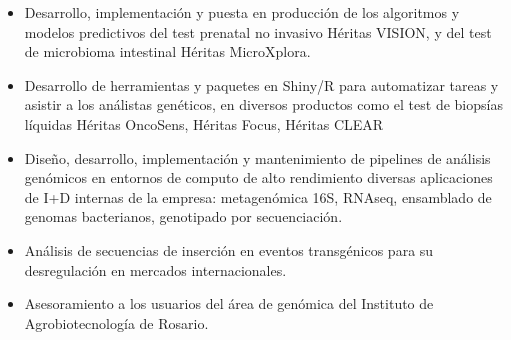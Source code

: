 \documentclass[10pt,a4paper,ragged2e]{altacv}
\begin{document}


\begin{itemize}
\item Desarrollo, implementación y puesta en producción de los algoritmos y modelos predictivos del test prenatal no invasivo
Héritas VISION, y del test de microbioma intestinal Héritas MicroXplora.
\item Desarrollo de herramientas y paquetes en Shiny/R para automatizar tareas y asistir a los análistas genéticos, en diversos
productos como el test de biopsías líquidas Héritas OncoSens, Héritas Focus, Héritas CLEAR
\item Diseño, desarrollo, implementación y mantenimiento de pipelines de análisis genómicos en entornos de computo de
alto rendimiento diversas aplicaciones de I+D internas de la empresa: metagenómica 16S, RNAseq, ensamblado de genomas bacterianos, genotipado por secuenciación.
\item Análisis de secuencias de inserción en eventos transgénicos para su desregulación en mercados internacionales.
\item Asesoramiento a los usuarios del área de genómica del Instituto de Agrobiotecnología de Rosario.
\end{itemize}


\end{document}
